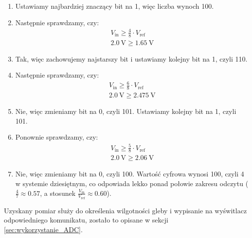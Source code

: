     \begin{enumerate}
        \item Ustawiamy najbardziej znaczący bit na 1, więc liczba wynoch 100.
        \item Następnie sprawdzamy, czy:
            \begin{align*}
                V_{\text{in}} \geq \frac{4}{8} \cdot V_{\text{ref}}\\
                \SI{2.0}{\volt} \geq \SI{1.65}{\volt}
            \end{align*}
        \item Tak, więc zachowujemy najstarszy bit i ustawiamy kolejny bit na 1, czyli 110.
        \item Następnie sprawdzamy, czy:
            \begin{align*}
                V_{\text{in}} \geq \frac{6}{8} \cdot V_{\text{ref}}\\
                \SI{2.0}{\volt} \geq \SI{2.475}{\volt}
            \end{align*}
        \item Nie, więc zmieniamy bit na 0, czyli 101. Ustawiamy kolejny bit na 1, czyli 101.
        \item Ponownie sprawdzamy, czy:
            \begin{align*}
                V_{\text{in}} \geq \frac{5}{8} \cdot V_{\text{ref}}\\
                \SI{2.0}{\volt} \geq \SI{2.06}{\volt}
            \end{align*}
        \item Nie, więc zmieniamy bit na 0, czyli 100. Wartość cyfrowa wynosi 100, czyli 4 w systemie dziesiętnym, co odpowiada lekko ponad połowie zakresu odczytu ($\frac{4}{7} \approx 0.57$, a stosunek $\frac{V_{\text{in}}}{V_{\text{ref}}} \approx 0.60$).
        
    \end{enumerate}
    Uzyskany pomiar służy do określenia wilgotności gleby i wypisanie na wyświtlacz odpowiedniego komunikatu, zostało to opisane w sekcji \ref{sec:wykorzystanie_ADC}.
